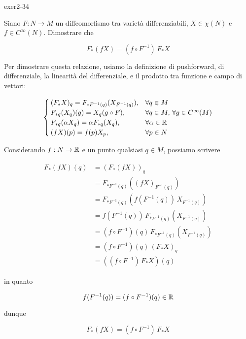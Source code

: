 {exer2-34}
{
Siano $ F : N \to M $ un diffeomorfismo tra varietà differenziabili, $ X \in \chi(N) $ e $ f \in C^{\infty}(N) $. Dimostrare che

\begin{equation}
	F_{*}(f X) = (f \circ F^{-1}) \, F_{*} X
\end{equation}
}
{
Per dimostrare questa relazione, usiamo la definizione di pushforward, di differenziale, la linearità del differenziale, e il prodotto tra funzione e campo di vettori:

\begin{equation}
	\begin{cases}
		(F_{*} X)_{q} = F_{*F^{-1}(q)} (X_{F^{-1}(q)}), & \forall q \in M \\
		F_{*q} (X_{q}) (g) = X_{q} (g \circ F), & \forall q \in M, \, \forall g \in C^{\infty}(M) \\
		F_{*q} (\alpha X_{q}) = \alpha F_{*q} (X_{q}), & \forall \alpha \in \mathbb{R} \\
		(f X)(p) = f(p) X_{p}, & \forall p \in N 
	\end{cases}
\end{equation}

Considerando $ f : N \to \mathbb{R} $ e un punto qualsiasi $ q \in M $, possiamo scrivere

\begin{align}
	\begin{split}
		F_{*}(f X)(q) &= (F_{*}(f X))_{q} \\
		&= F_{*F^{-1}(q)} ((f X)_{F^{-1}(q)}) \\
		&= F_{*F^{-1}(q)} (f(F^{-1}(q)) \, X_{F^{-1}(q)}) \\
		&= f(F^{-1}(q)) \, F_{*F^{-1}(q)} (X_{F^{-1}(q)}) \\
		&= (f \circ F^{-1})(q) \, F_{*F^{-1}(q)} (X_{F^{-1}(q)}) \\
		&= (f \circ F^{-1})(q) \, (F_{*} X)_{q} \\
		&= ((f \circ F^{-1}) \, F_{*} X)(q)
	\end{split}
\end{align}

in quanto

\begin{equation}
	f(F^{-1}(q)) = (f \circ F^{-1})(q) \in \mathbb{R}
\end{equation}

dunque

\begin{equation}
	F_{*}(f X) = (f \circ F^{-1}) \, F_{*} X
\end{equation}
}
